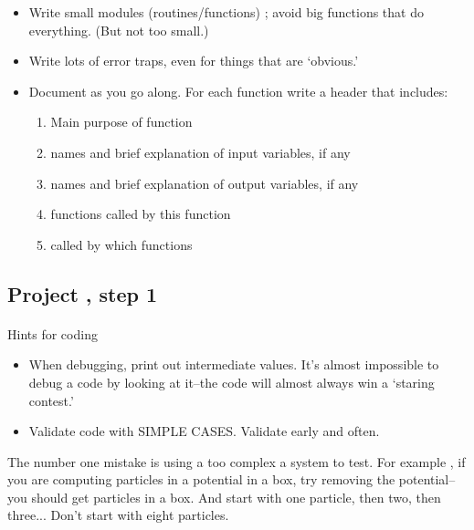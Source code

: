 \documentclass[%
twoside,                 %
final,                   %
10pt]{article}
\begin{document}
\begin{itemize}
\item Write small modules (routines/functions) ; avoid big functions  that do everything. (But not too small.)

\item Write lots of error traps, even for things that are `obvious.'

\item Document as you go along.  For each function write a header that includes: 
\begin{enumerate}

\item Main purpose of function

\item names and  brief explanation of input variables, if any 

\item names and brief explanation of output variables, if any

\item functions called by this function

\item called by which functions
\end{enumerate}

\noindent
\end{itemize}

\noindent



\subsection{Project , step 1}

\paragraph{}

Hints for coding

\begin{itemize}
\item When debugging, print out intermediate values. It's almost impossible to debug a  code by looking at it--the code will almost always win a `staring contest.'

\item Validate code with SIMPLE CASES. Validate early and often.   
\end{itemize}

\noindent
The number one mistake is using a too complex a system to test. For example ,
if you are computing particles in a potential in a box, try removing the potential--you should get 
particles in a box. And start with one particle, then two, then three... Don't start with 
eight particles.
\end{document}
